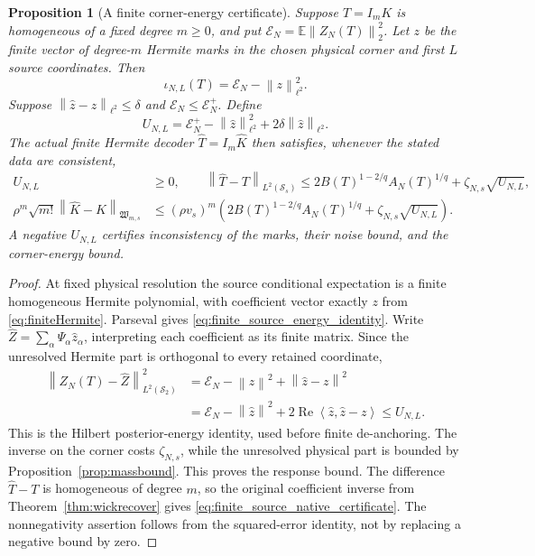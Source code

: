 \documentclass[11pt,a4paper]{amsart}
\numberwithin{equation}{section}
\newtheorem{proposition}[theorem]{Proposition}
\theoremstyle{definition}
\theoremstyle{remark}
\newcommand{\E}{\mathbb E}
\newcommand{\Sch}{\mathcal S}
\newcommand{\Wc}{\mathfrak W}
\newcommand{\norm}[1]{\left\lVert#1\right\rVert}
\newcommand{\ip}[2]{\left\langle#1,#2\right\rangle}
\begin{document}
\begin{proposition}[A finite corner-energy certificate]\label{prop:finite_source_energy}
Suppose $T=I_mK$ is homogeneous of a fixed degree $m\ge0$, and put
$\mathscr E_N=\E\norm{Z_N(T)}_2^2$. Let $z$ be the finite vector of degree-$m$ Hermite marks in the chosen physical corner and first $L$ source coordinates. Then
\begin{equation}\label{eq:finite_source_energy_identity}
 \iota_{N,L}(T)=\mathscr E_N-\norm z_{\ell^2}^2.
\end{equation}
Suppose $\norm{\widehat z-z}_{\ell^2}\le\delta$ and $\mathscr E_N\le\mathscr E_N^+$. Define
\begin{equation}\label{eq:finite_source_energy_budget}
 U_{N,L}=\mathscr E_N^+-\norm{\widehat z}_{\ell^2}^2
                      +2\delta\norm{\widehat z}_{\ell^2}.
\end{equation}
The actual finite Hermite decoder $\widehat T=I_m\widehat K$ then satisfies, whenever the stated data are consistent,
\begin{align}
 U_{N,L}&\ge0,\qquad
 \norm{\widehat T-T}_{L^2(\Sch_s)}
 \le2B(T)^{1-2/q}A_N(T)^{1/q}+\zeta_{N,s}\sqrt{U_{N,L}},
 \label{eq:finite_source_response_certificate}\\
 \rho^m\sqrt{m!}\norm{\widehat K-K}_{\Wc_{m,s}}
 &\le(\rho v_s)^m
 \left(2B(T)^{1-2/q}A_N(T)^{1/q}+\zeta_{N,s}\sqrt{U_{N,L}}\right).
 \label{eq:finite_source_native_certificate}
\end{align}
A negative $U_{N,L}$ certifies inconsistency of the marks, their noise bound, and the corner-energy bound.
\end{proposition}
\begin{proof}
At fixed physical resolution the source conditional expectation is a finite homogeneous Hermite polynomial, with coefficient vector exactly $z$ from \eqref{eq:finiteHermite}. Parseval gives \eqref{eq:finite_source_energy_identity}. Write $\widehat Z=\sum_\alpha\Psi_\alpha\widehat z_\alpha$, interpreting each coefficient as its finite matrix. Since the unresolved Hermite part is orthogonal to every retained coordinate,
\begin{align*}
 \norm{Z_N(T)-\widehat Z}_{L^2(\Sch_2)}^2
 &=\mathscr E_N-\norm z^2+\norm{\widehat z-z}^2\\
 &=\mathscr E_N-\norm{\widehat z}^2
       +2\operatorname{Re}\ip{\widehat z}{\widehat z-z}
 \le U_{N,L}.
\end{align*}
This is the Hilbert posterior-energy identity, used before finite de-anchoring. The inverse on the corner costs $\zeta_{N,s}$, while the unresolved physical part is bounded by Proposition~\ref{prop:massbound}. This proves the response bound. The difference $\widehat T-T$ is homogeneous of degree $m$, so the original coefficient inverse from Theorem~\ref{thm:wickrecover} gives \eqref{eq:finite_source_native_certificate}. The nonnegativity assertion follows from the squared-error identity, not by replacing a negative bound by zero.
\end{proof}
\end{document}
